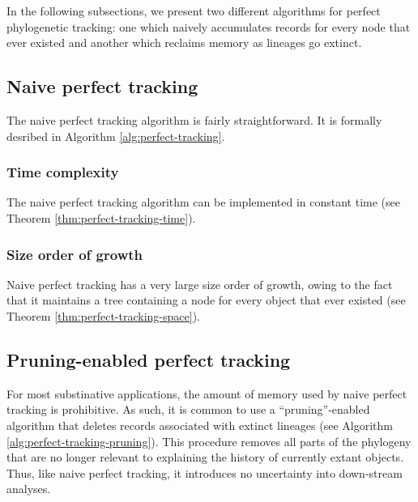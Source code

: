 In the following subsections, we present two different algorithms for perfect phylogenetic tracking: one which naively accumulates records for every node that ever existed and another which reclaims memory as lineages go extinct.

\subsection{Naive perfect tracking}
\label{sec:naive-perfect-tracking}

The naive perfect tracking algorithm is fairly straightforward.
It is formally desribed in Algorithm \ref{alg:perfect-tracking}.



\subsubsection{Time complexity}

The naive perfect tracking algorithm can be implemented in constant time (see Theorem \ref{thm:perfect-tracking-time}).



\subsubsection{Size order of growth}

Naive perfect tracking has a very large size order of growth, owing to the fact that it maintains a tree containing a node for every object that ever existed (see Theorem \ref{thm:perfect-tracking-space}).



\subsection{Pruning-enabled perfect tracking}
\label{sec:naive-perfect-tracking-with-pruning}

For most substinative applications, the amount of memory used by naive perfect tracking is prohibitive.
As such, it is common to use a ``pruning''-enabled algorithm that deletes records associated with extinct lineages (see Algorithm \ref{alg:perfect-tracking-pruning}).
This procedure removes all parts of the phylogeny that are no longer relevant to explaining the history of currently extant objects.
Thus, like naive perfect tracking, it introduces no uncertainty into down-stream analyses.

